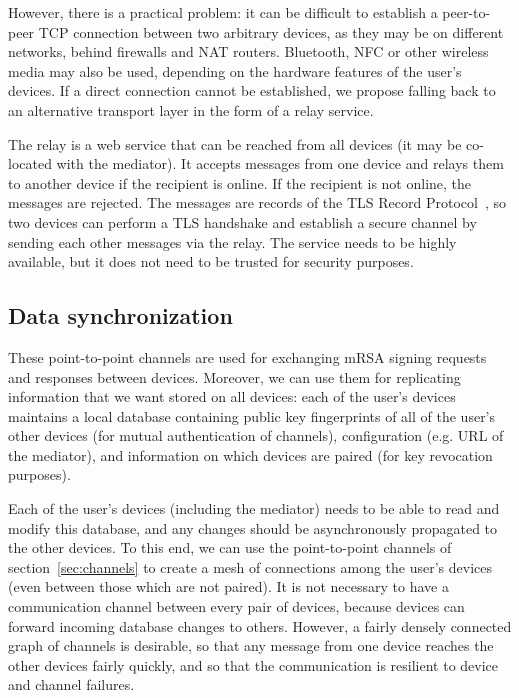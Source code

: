 
However, there is a practical problem: it can be difficult to establish a peer-to-peer TCP
connection between two arbitrary devices, as they may be on different networks, behind firewalls and
NAT routers. Bluetooth, NFC or other wireless media may also be used, depending on the hardware
features of the user's devices. If a direct connection cannot be established, we propose falling
back to an alternative transport layer in the form of a relay service.

The relay is a web service that can be reached from all devices (it may be co-located with the
mediator). It accepts messages from one device and relays them to another device if the recipient is
online. If the recipient is not online, the messages are rejected. The messages are records of the
TLS Record Protocol~\cite{TLS}, so two devices can perform a TLS handshake and establish a secure
channel by sending each other messages via the relay. The service needs to be highly available, but
it does not need to be trusted for security purposes.

\subsection{Data synchronization}\label{sec:devicesync}

These point-to-point channels are used for exchanging mRSA signing requests and responses between
devices. Moreover, we can use them for replicating information that we want stored on all devices:
each of the user's devices maintains a local database containing public key fingerprints of all of
the user's other devices (for mutual authentication of channels), configuration (e.g. URL of the
mediator), and information on which devices are paired (for key revocation purposes).

Each of the user's devices (including the mediator) needs to be able to read and modify this
database, and any changes should be asynchronously propagated to the other devices. To this end, we
can use the point-to-point channels of section~\ref{sec:channels} to create a mesh of connections
among the user's devices (even between those which are not paired). It is not necessary to have a
communication channel between every pair of devices, because devices can forward incoming database
changes to others. However, a fairly densely connected graph of channels is desirable, so that any
message from one device reaches the other devices fairly quickly, and so that the communication is
resilient to device and channel failures.

